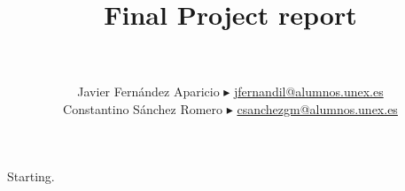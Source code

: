 \documentclass[8pt,a2paper,dvipsnames]{article}
\title{\vspace{-2cm}\textbf{Final Project report \duda{?}}}
\date{}
\author{\duda{?} \\ \duda{?} \\ Javier Fernández Aparicio $\blacktriangleright$ \href{mailto:jfernandil@alumnos.unex.es}{jfernandil@alumnos.unex.es} \\Constantino Sánchez Romero $\blacktriangleright$ \href{mailto:csanchezgm@alumnos.unex.es}{csanchezgm@alumnos.unex.es}}
\begin{document}
\maketitle
\noindent
Starting.
\end{document}
